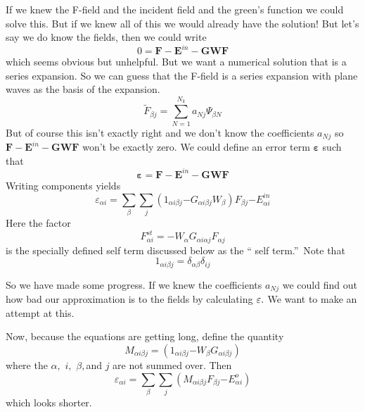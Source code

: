 \documentclass{article}
\begin{document}
If we knew the F-field and the incident field and the green's function we
could solve this. But if we knew all of this we would already have the
solution! But let's say we do know the fields, then we could write 
\begin{equation}
0=\mathbf{F-E}^{in}-\mathbf{GWF}
\end{equation}%
which seems obvious but unhelpful. But we want a numerical solution that is
a series expansion. So we can guess that the F-field is a series expansion
with plane waves as the basis of the expansion. 
\begin{equation}
\tilde{F}_{\beta j}\mathbf{=}\sum_{N=1}^{N_{k}}a_{Nj}\Psi _{\beta N}
\end{equation}%
But of course this isn't exactly right and we don't know the coefficients $%
a_{Nj}$ so $\mathbf{F-E}^{in}-\mathbf{GWF}$ won't be exactly zero. We could
define an error term $\mathbf{\varepsilon }$ such that 
\begin{equation}
\mathbf{\varepsilon }=\mathbf{F}-\mathbf{E}^{in}-\mathbf{GWF}
\end{equation}%
Writing components yields 
\begin{equation}
\varepsilon _{\alpha i}\mathbf{=}\sum_{\beta }\sum_{j}\left( 1_{\alpha
i\beta j}\mathbf{-}G_{\alpha i\beta j}W_{\beta }\right) F_{\beta j}\mathbf{-}%
E_{\alpha i}^{in}
\end{equation}%
Here the factor 
\begin{equation}
F_{\alpha i}^{st}=-W_{\alpha }G_{\alpha i\alpha j}F_{\alpha j}  \label{AST}
\end{equation}%
is the specially defined self term discussed below as the \textquotedblleft
self term.\textquotedblright\ Note that 
\begin{equation}
1_{\alpha i\beta j}=\delta _{\alpha \beta }\delta _{ij}
\end{equation}

So we have made some progress. If we knew the coefficients $a_{Nj}$ we could
find out how bad our approximation is to the fields by calculating $\mathbf{%
\varepsilon .}$ We want to make an attempt at this.

Now, because the equations are getting long, define the quantity 
\begin{equation}
M_{\alpha i\beta j}=\left( 1_{\alpha i\beta j}\mathbf{-}W_{\beta }G_{\alpha
i\beta j}\right)
\end{equation}%
where the $\alpha ,$ $i,$ $\beta ,$and $j$ are not summed over. Then 
\begin{equation}
\varepsilon _{\alpha i}\mathbf{=}\sum_{\beta }\sum_{j}\left( M_{\alpha
i\beta j}F_{\beta j}\mathbf{-}E_{\alpha i}^{o}\right)  \label{M}
\end{equation}%
which looks shorter.
\end{document}
